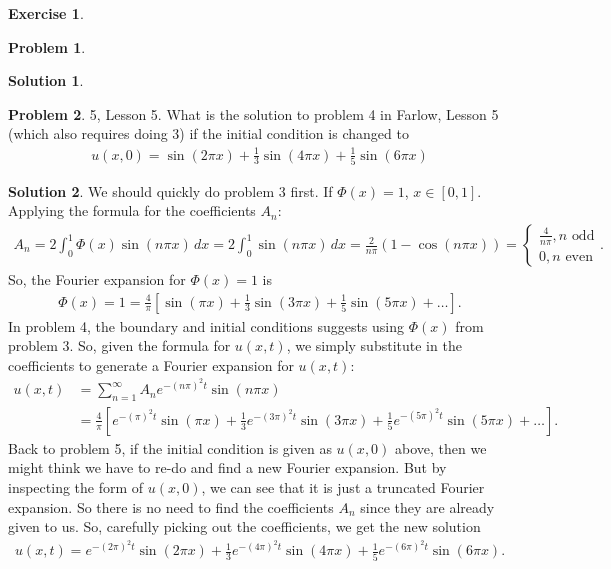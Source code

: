 \documentclass{article}
\theoremstyle{definition}
\newtheorem*{prob*}{Problem}
\newtheorem*{exer*}{Exercise}
\newtheorem*{sln*}{Solution}
\begin{document}
\begin{exer*}
\begin{prob*}
\begin{sln*}
		\end{sln*}
	\end{prob*}
	\newpage
	\begin{prob*}5, Lesson 5. What is the solution to problem 4 in Farlow, Lesson 5 (which also requires doing 3) if the initial condition is changed to 
		\begin{align*}
		u(x,0) = \sin(2\pi x) + \frac{1}{3}\sin(4\pi x) + \frac{1}{5}\sin(6\pi x)
		\end{align*}
		\begin{sln*}
			We should quickly do problem 3 first. If $\Phi(x) = 1$, $x\in[0,1]$. Applying the formula for the coefficients $A_n$:
			\begin{align*}
			A_n = 2\int_0^1\Phi(x)\sin(n\pi x)\,dx = 2\int_0^1\sin(n\pi x)\,dx = \frac{2}{n\pi}(1-\cos(n\pi x)) = \begin{cases}
			\frac{4}{n\pi}, n \text{ odd}\\
			0, n\text{ even}
			\end{cases}.
			\end{align*}
			So, the Fourier expansion for $\Phi(x) = 1$ is
			\begin{align*}
			\Phi(x) =1 = \frac{4}{\pi}\left[\sin(\pi x) + \frac{1}{3}\sin(3\pi x) + \frac{1}{5}\sin(5\pi x)+\dots \right].
			\end{align*}
			In problem 4, the boundary and initial conditions suggests using $\Phi(x)$ from problem 3. So, given the formula for $u(x,t)$, we simply substitute in the coefficients to generate a Fourier expansion for $u(x,t)$:
			\begin{align*}
			u(x,t) &= \sum_{n=1}^{\infty}A_n e^{-(n\pi)^2t}\sin(n\pi x)\\
			&= \frac{4}{\pi}\left[ e^{-(\pi)^2t}\sin(\pi x) + \frac{1}{3}e^{-(3\pi)^2t}\sin(3\pi x)
			+ \frac{1}{5}e^{-(5\pi)^2t}\sin(5\pi x)+\dots\right].
			\end{align*}
			Back to problem 5, if the initial condition is given as $u(x,0)$ above, then we might think we have to re-do and find a new Fourier expansion. But by inspecting the form of $u(x,0)$, we can see that it is just a truncated Fourier expansion. So there is no need to find the coefficients $A_n$ since they are already given to us. So, carefully picking out the coefficients, we get the new solution
			\begin{align*}
			u(x,t) = e^{-(2\pi)^2t}\sin(2\pi x) + \frac{1}{3}e^{-(4\pi)^2t}\sin(4\pi x) + \frac{1}{5}e^{-(6\pi)^2t}\sin(6\pi x).
			\end{align*}
		\end{sln*}
	\end{prob*}
\end{exer*}
\end{document}
